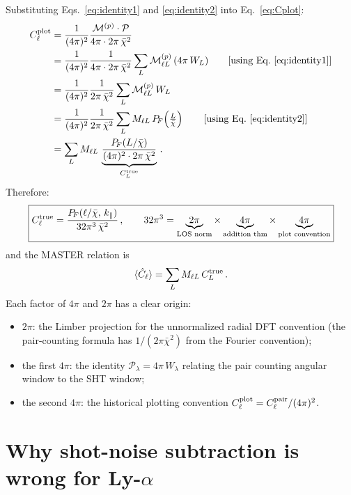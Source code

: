 \documentclass[11pt,a4paper]{article}
\newcommand{\chibar}{\bar{\chi}}
\newcommand{\PF}{P_{\!F}}
\newcommand{\Cl}{\hat{C}_\ell}
\begin{document}
Substituting Eqs.~\eqref{eq:identity1} and \eqref{eq:identity2} into
Eq.~\eqref{eq:Cplot}:
\begin{align}
  C_\ell^{\rm plot}
  &= \frac{1}{(4\pi)^2}
    \frac{\mathcal{M}^{(p)} \cdot \mathcal{P}}
         {4\pi\cdot 2\pi\,\chibar^2}
  \nonumber\\
  &= \frac{1}{(4\pi)^2}
    \frac{1}{4\pi\cdot 2\pi\,\chibar^2}
    \sum_L \mathcal{M}^{(p)}_{\ell L}\, (4\pi\, W_L)
  \qquad\text{[using Eq.~\eqref{eq:identity1}]}
  \nonumber\\
  &= \frac{1}{(4\pi)^2}
    \frac{1}{2\pi\,\chibar^2}
    \sum_L \mathcal{M}^{(p)}_{\ell L}\, W_L
  \nonumber\\
  &= \frac{1}{(4\pi)^2}
    \frac{1}{2\pi\,\chibar^2}
    \sum_L M_{\ell L}\, \PF\!\left(\tfrac{L}{\chibar}\right)
  \qquad\text{[using Eq.~\eqref{eq:identity2}]}
  \nonumber\\
  &= \sum_L M_{\ell L}\,
    \underbrace{
      \frac{\PF(L/\chibar)}{(4\pi)^2 \cdot 2\pi\,\chibar^2}
    }_{C_L^{\rm true}}\,.
\end{align}
Therefore:
\begin{equation}
  \boxed{
    C_\ell^{\rm true}
    = \frac{\PF(\ell/\chibar,\,k_\parallel)}{32\pi^3\,\chibar^2}\,,
    \qquad
    32\pi^3 = \underbrace{2\pi}_{\text{LOS norm}}
    \times\underbrace{4\pi}_{\text{addition thm}}
    \times\underbrace{4\pi}_{\text{plot convention}}
  }
  \label{eq:Ctrue}
\end{equation}
and the MASTER relation is
\begin{equation}
  \langle \Cl \rangle = \sum_L M_{\ell L}\, C_L^{\rm true}\,.
  \label{eq:master}
\end{equation}
Each factor of $4\pi$ and $2\pi$ has a clear origin:
\begin{itemize}
  \item $2\pi$: the Limber projection for the unnormalized radial DFT convention
    (the pair-counting formula has $1/(2\pi\chibar^2)$ from the Fourier convention);
  \item the first $4\pi$: the identity $\mathcal{P}_\lambda = 4\pi\, W_\lambda$
    relating the pair counting angular window to the SHT window;
  \item the second $4\pi$: the historical plotting convention
    $C_\ell^{\rm plot} = C_\ell^{\rm pair} / (4\pi)^2$.
\end{itemize}


\section{Why shot-noise subtraction is wrong for Ly-$\alpha$}
\label{sec:sn}
\end{document}
